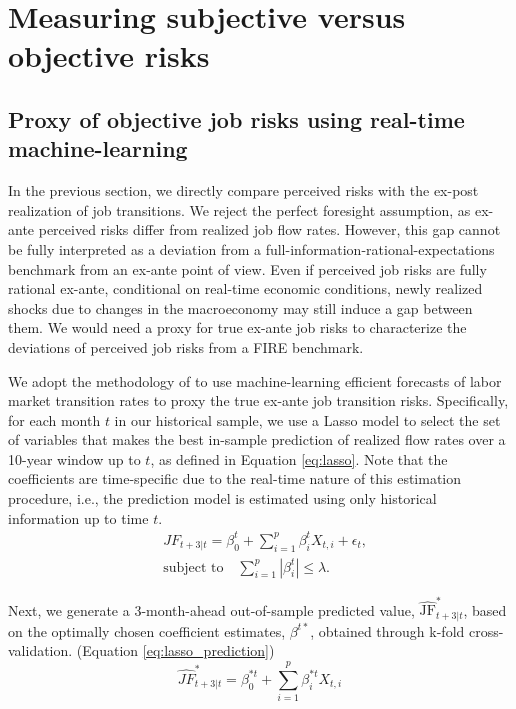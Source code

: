 
\section{Measuring subjective versus objective risks}

\subsection{Proxy of objective job risks using real-time machine-learning}

In the previous section, we directly compare perceived risks with the ex-post realization of job transitions. We reject the perfect foresight assumption, as ex-ante perceived risks differ from realized job flow rates. However, this gap cannot be fully interpreted as a deviation from a full-information-rational-expectations benchmark from an ex-ante point of view. Even if perceived job risks are fully rational ex-ante, conditional on real-time economic conditions, newly realized shocks due to changes in the macroeconomy may still induce a gap between them. We would need a proxy for true ex-ante job risks to characterize the deviations of perceived job risks from a FIRE benchmark.

We adopt the methodology of \cite{bianchi2022belief} to use machine-learning efficient forecasts of labor market transition rates to proxy the true ex-ante job transition risks. Specifically, for each month $t$ in our historical sample, we use a Lasso model to select the set of variables that makes the best in-sample prediction of realized flow rates over a 10-year window up to $t$, as defined in Equation \ref{eq:lasso}. Note that the coefficients are time-specific due to the real-time nature of this estimation procedure, i.e., the prediction model is estimated using only historical information up to time $t$. 
\begin{equation}
\begin{split}
\label{eq:lasso}
 &   JF_{t+3|t} = \beta_0^t + \sum_{i=1}^{p} \beta_i^t X_{t,i} + \epsilon_t, \\
 &   \text{subject to} \quad \sum_{i=1}^{p} |\beta_i^t| \leq \lambda.
\end{split}
\end{equation}

Next, we generate a 3-month-ahead out-of-sample predicted value, $\widehat{\text{JF}}^*_{t+3|t}$, based on the optimally chosen coefficient estimates, $\beta^{t*}$, obtained through k-fold cross-validation. (Equation \ref{eq:lasso_prediction})
\begin{equation}
    \label{eq:lasso_prediction}
    \widehat{JF}^*_{t+3|t} =  \beta_0^{*t} + \sum_{i=1}^{p} \beta_i^{*t} X_{t,i}
\end{equation}


